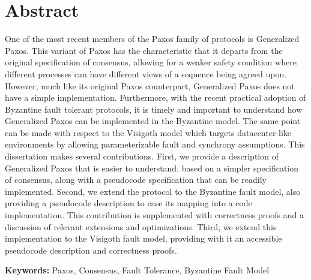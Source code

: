 
\section*{Abstract}


One of the most recent members of the Paxos family of
protocols is Generalized Paxos. This variant of Paxos has the characteristic that it departs from the original specification of consensus, allowing for a
weaker safety condition where different processes can have different views of a sequence being agreed upon. However, much like its original Paxos counterpart, Generalized Paxos does not have a simple implementation. Furthermore, with the recent practical adoption of Byzantine fault tolerant protocols, it is timely and important to understand how Generalized Paxos can be implemented in the Byzantine model. The same point can be made with respect to the Visigoth model which targets datacenter-like environments by allowing parameterizable fault and synchrony assumptions. This dissertation makes several contributions. First, we provide a description of Generalized Paxos that is easier to understand, based on a simpler specification of consensus, along with a pseudocode specification that can be readily implemented. Second, we extend the protocol to the Byzantine fault model, also providing a pseudocode description to ease its mapping into a code implementation. This contribution is supplemented  with correctness proofs and a discussion of relevant extensions and optimizations. Third, we extend this implementation to the Visigoth fault model, providing with it an accessible pseudocode description and correctness proofs. 

\vfill

\textbf{\Large Keywords:} Paxos, Consensus, Fault Tolerance, Byzantine Fault Model

